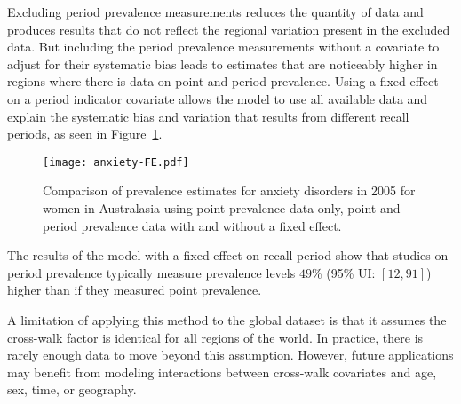 Excluding period prevalence measurements reduces the quantity of data
and produces results that do not reflect the regional variation
present in the excluded data.  But including the period prevalence
measurements without a covariate to adjust for their systematic bias
leads to estimates that are noticeably higher in regions where there is
data on point and period prevalence.  Using a fixed effect on a period
indicator covariate allows the model to use all available data and
explain the systematic bias and variation that results from different
recall periods, as seen in Figure~\ref{fig:app-anxiety FE}.

    \begin{figure}[h]
        \begin{center}
            \texttt{[image: anxiety-FE.pdf]}
            \caption{Comparison of prevalence estimates for anxiety
              disorders in 2005 for women in Australasia using point
              prevalence data only, point and period prevalence data
              with and without a fixed effect.}
            \label{fig:app-anxiety FE}
        \end{center}
    \end{figure}

The results of the model with a fixed effect on recall period show
that studies on period prevalence typically measure prevalence levels
$49$\% (95\% UI: $[12, 91]$) higher than if they measured point
prevalence.

A limitation of applying this method to the global dataset is that it
assumes the cross-walk factor is identical for all regions of the
world.  In practice, there is rarely enough data to move beyond this
assumption.  However, future applications may benefit from modeling
interactions between cross-walk covariates and age, sex, time, or
geography.
